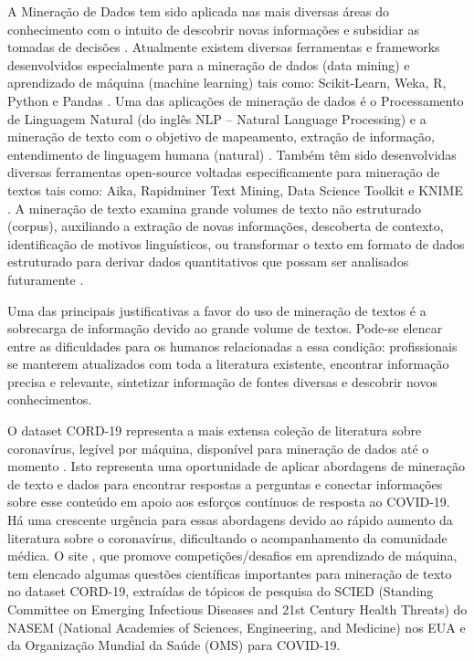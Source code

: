 \documentclass[
	12pt,				%
	a4paper,			%
	english,			%
	brazil,				%
	]{article}
\begin{document}
A Minera\c c\~ ao de Dados tem sido aplicada nas mais diversas \' areas do conhecimento com o intuito de descobrir novas informa\c c\~ oes e subsidiar as tomadas de decis\~ oes \cite{bramer2007principles, aggarwal2015data}. Atualmente existem diversas ferramentas e frameworks desenvolvidos especialmente para a minera\c c\~ ao de dados (data mining) e aprendizado de m\' aquina (machine learning) tais como: Scikit-Learn, Weka, R, Python e Pandas \cite{geron19}. Uma das aplica\c c\~ oes de minera\c c\~ ao de dados \' e o Processamento de Linguagem Natural (do ingl\^ es NLP – Natural Language Processing) e a minera\c c\~ ao de texto com o objetivo de mapeamento, extra\c c\~ ao de informa\c c\~ ao, entendimento de linguagem humana (natural) \cite{dinov2018data}. Tamb\' em t\^ em sido desenvolvidas diversas ferramentas open-source voltadas especificamente para minera\c c\~ ao de textos tais como: Aika, Rapidminer Text Mining, Data Science Toolkit e KNIME \cite{kaur2016comparison}. A minera\c c\~ ao de texto examina grande volumes de texto n\~ ao estruturado (corpus), auxiliando a extra\c c\~ ao de novas informa\c c\~ oes, descoberta de contexto, identifica\c c\~ ao de motivos lingu\' isticos, ou transformar o texto em formato de dados estruturado para derivar dados quantitativos que possam ser analisados futuramente \cite{aggarwal2015data}.

Uma das principais justificativas a favor do uso de minera\c c\~ ao de textos \' e a sobrecarga de informa\c c\~ ao devido ao grande volume de textos. Pode-se elencar entre as dificuldades para os humanos relacionadas a essa condi\c c\~ ao: profissionais se manterem atualizados com toda a literatura existente, encontrar informa\c c\~ ao precisa e relevante, sintetizar informa\c c\~ ao de fontes diversas e descobrir novos conhecimentos.

O dataset CORD-19 representa a mais extensa cole\c c\~ ao de literatura sobre coronav\' irus, leg\' ivel por m\' aquina, dispon\' ivel para minera\c c\~ ao de dados at\' e o momento \cite{kaggle20online}. Isto representa uma oportunidade de aplicar abordagens de minera\c c\~ ao de texto e dados para encontrar respostas a perguntas e conectar informa\c c\~ oes sobre esse conte\' udo em apoio aos esfor\c cos cont\' inuos de resposta ao COVID-19. H\' a uma crescente urg\^ encia para essas abordagens devido ao r\' apido aumento da literatura sobre o coronav\' irus, dificultando o acompanhamento da comunidade m\' edica. O site , que promove competi\c c\~ oes/desafios em aprendizado de m\' aquina, tem elencado algumas quest\~ oes cient\' ificas importantes para minera\c c\~ ao de texto no dataset CORD-19, extra\' idas de t\' opicos de pesquisa do SCIED (Standing Committee on Emerging Infectious Diseases and 21st Century Health Threats) do NASEM (National Academies of Sciences, Engineering, and Medicine) nos EUA e da Organiza\c c\~ ao Mundial da Sa\' ude (OMS) para COVID-19.
\end{document}
